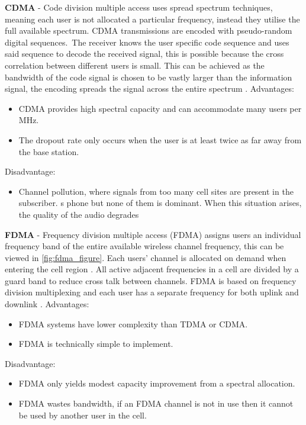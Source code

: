 \documentclass{article}
\begin{document}
\textbf{CDMA} - Code division multiple access uses spread spectrum techniques, meaning each user is not allocated a particular frequency, instead they utilise the full available spectrum. CDMA transmissions are encoded with pseudo-random digital sequences\cite{cdma_info}.\ The receiver knows the user specific code sequence and uses said sequence to decode the received signal, this is possible because the cross correlation between different users is small. This can be achieved as the bandwidth of the code signal is chosen to be vastly larger than the information signal, the encoding spreads the signal across the entire spectrum \cite{cdma_info}. \newline
Advantages:\
\begin{itemize}
    \item CDMA provides high spectral capacity and can accommodate many users per MHz.
    \item The dropout rate only occurs when the user is at least twice as far away from the base station.
\end{itemize}
Disadvantage:\
\begin{itemize}
    \item Channel pollution, where signals from too many cell sites are present in the subscriber. s phone but none of them is dominant. When this situation arises, the quality of the audio degrades
\end{itemize}
\textbf{FDMA} - Frequency division multiple access (FDMA) assigns users an individual frequency band of the entire available wireless channel frequency, this can be viewed in \cref{fig:fdma_figure}. Each users' channel is allocated on demand when entering the cell region \cite[Section...]{fdma_info}. All active adjacent frequencies in a cell are divided by a guard band to reduce cross talk between channels. FDMA is based on frequency division multiplexing and each user has a separate frequency for both uplink and downlink \cite{fdma_info}.  
Advantages:\
\begin{itemize}
    \item FDMA systems have lower complexity than TDMA or CDMA.
    \item FDMA is technically simple to implement. 
\end{itemize}
Disadvantage:\
\begin{itemize}
    \item FDMA only yields modest capacity improvement from a spectral allocation.
    \item FDMA wastes bandwidth, if an FDMA channel is not in use then it cannot be used by another user in the cell. 
\end{itemize}
\end{document}
